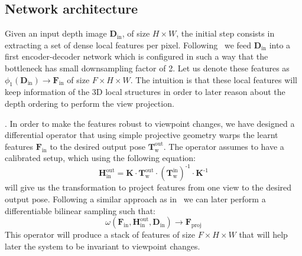 \subsection{Network architecture}
Given an input depth image $\mathbf{D}_{\textrm{in}}$, of size $H\times W$, the initial step consists in extracting a set of dense local features per pixel. Following~\cite{pix2pix2017} we feed $\mathbf{D}_{\textrm{in}}$ into a first encoder-decoder network which is configured in such  a way that the bottleneck has  small downsampling factor of 2. Let us denote these features as $\phi_1(\mathbf{D}_{\textrm{in}}) \rightarrow \mathbf{F}_{\textrm{in}}$ of size $F\times H \times W$. The intuition is that these local features will keep information of the 3D local structures in order to later reason about the depth ordering to perform the view projection.

\vspace{1mm}
. In order to make the features robust to viewpoint changes, we have designed a differential operator that using simple projective geometry warps the learnt features $\mathbf{F}_{\textrm{in}}$ to the desired output pose $\mathbf{T}_{\textrm{w}}^{\textrm{out}}$. The operator assumes to have a calibrated setup, which using the following equation:
\begin{equation}
    \mathbf{H}_{\textrm{in}}^{\textrm{out}} = \mathbf{K} \cdot \mathbf{T}_{\textrm{w}}^{\textrm{out}} \cdot (\mathbf{T}_{\textrm{w}}^{\textrm{in}})^{\textrm{-1}} \cdot \mathbf{K}^{\textrm{-1}}
\end{equation}
 will give us the transformation to project features from one view to the desired output pose. Following a similar approach as in~\cite{NIPS2015_5854, eriba2020kornia} we can later perform a differentiable bilinear sampling such that:
 \begin{equation}
    \omega(\mathbf{F}_{\textrm{in}}, \mathbf{H}_{\textrm{in}}^{\textrm{out}}, \mathbf{D}_{\textrm{in}}) \rightarrow \mathbf{F}_{\textrm{proj}}
 \end{equation}
This operator will produce a stack of features of size $F\times H \times W$ that will help later the system to be invariant to viewpoint changes.

